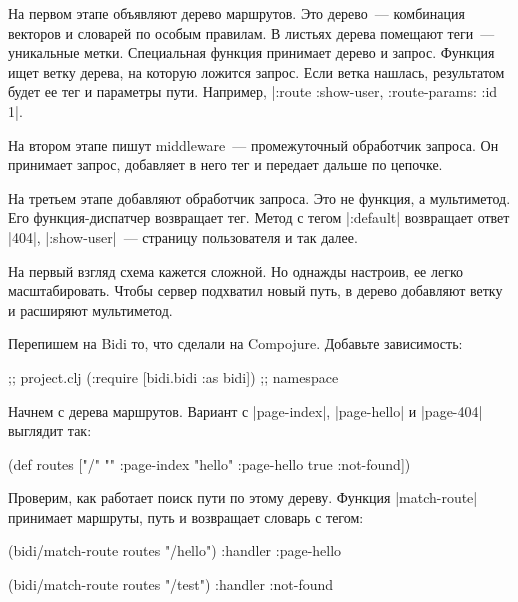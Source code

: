 На первом этапе объявляют дерево маршрутов. Это дерево~--- комбинация векторов и
словарей по особым правилам. В листьях дерева помещают теги~--- уникальные
метки. Специальная функция принимает дерево и запрос. Функция ищет ветку дерева,
на которую ложится запрос. Если ветка нашлась, результатом будет ее тег и
параметры пути. Например, \spverb|{:route :show-user, :route-params: {:id 1}}|.

На втором этапе пишут middleware~--- промежуточный обработчик запроса. Он
принимает запрос, добавляет в него тег и передает дальше по цепочке.

На третьем этапе добавляют обработчик запроса. Это не функция, а мультиметод.
Его функция-диспатчер возвращает тег. Метод с тегом \spverb|:default| возвращает
ответ \spverb|404|, \spverb|:show-user|~--- страницу пользователя и так далее.

На первый взгляд схема кажется сложной. Но однажды настроив, ее легко
масштабировать. Чтобы сервер подхватил новый путь, в дерево добавляют ветку и
расширяют мультиметод.

Перепишем на Bidi то, что сделали на Compojure. Добавьте зависимость:

\begin{english}
  \begin{clojure}
[bidi "2.1.5"]                  ;; project.clj
(:require [bidi.bidi :as bidi]) ;; namespace
  \end{clojure}
\end{english}

Начнем с дерева маршрутов. Вариант с \spverb|page-index|, \spverb|page-hello| и
\spverb|page-404| выглядит так:

\begin{english}
  \begin{clojure}
(def routes
  ["/" {""      :page-index
        "hello" :page-hello
        true    :not-found}])
  \end{clojure}
\end{english}

Проверим, как работает поиск пути по этому дереву. Функция \spverb|match-route|
принимает маршруты, путь и возвращает словарь с тегом:

\begin{english}
  \begin{clojure}
(bidi/match-route routes "/hello")
{:handler :page-hello}

(bidi/match-route routes "/test")
{:handler :not-found}
  \end{clojure}
\end{english}

